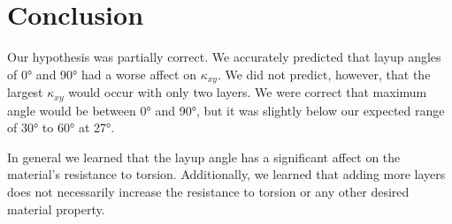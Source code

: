 \documentclass[12 pt]{article}
\begin{document}
\begin{enumerate}
\end{enumerate}

\section{Conclusion} \label{conclusion}
Our hypothesis was partially correct. We accurately predicted that layup angles of \ang{0} and \ang{90} had a worse affect on $\kappa_{xy}$. We did not predict, however, that the largest $\kappa_{xy}$ would occur with only two layers. We were correct that maximum angle would be between \ang{0} and \ang{90}, but it was slightly below our expected range of \ang{30} to \ang{60} at \ang{27}.

In general we learned that the layup angle has a significant affect on the material's resistance to torsion. Additionally, we learned that adding more layers does not necessarily increase the resistance to torsion or any other desired material property.
\end{document}
